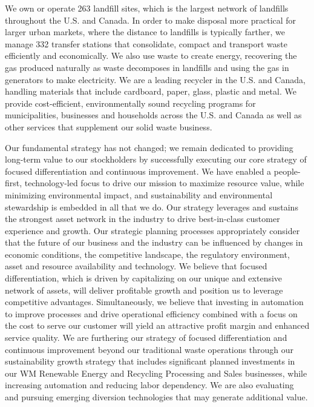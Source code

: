 \documentclass{article}
\begin{document}
We own or operate 263 landfill sites, which is the largest network of landfills throughout the U.S. and Canada. In order to make disposal more practical for larger urban markets, where the distance to landfills is typically farther, we manage 332 transfer stations that consolidate, compact and transport waste efficiently and economically. We also use waste to create energy, recovering the gas produced naturally as waste decomposes in landfills and using the gas in generators to make electricity. We are a leading recycler in the U.S. and Canada, handling materials that include cardboard, paper, glass, plastic and metal. We provide cost-efficient, environmentally sound recycling programs for municipalities, businesses and households across the U.S. and Canada as well as other services that supplement our solid waste business.

Our fundamental strategy has not changed; we remain dedicated to providing long-term value to our stockholders by successfully executing our core strategy of focused differentiation and continuous improvement. We have enabled a people-first, technology-led focus to drive our mission to maximize resource value, while minimizing environmental impact, and sustainability and environmental stewardship is embedded in all that we do. Our strategy leverages and sustains the strongest asset network in the industry to drive best-in-class customer experience and growth. Our strategic planning processes appropriately consider that the future of our business and the industry can be influenced by changes in economic conditions, the competitive landscape, the regulatory environment, asset and resource availability and technology. We believe that focused differentiation, which is driven by capitalizing on our unique and extensive network of assets, will deliver profitable growth and position us to leverage competitive advantages. Simultaneously, we believe that investing in automation to improve processes and drive operational efficiency combined with a focus on the cost to serve our customer will yield an attractive profit margin and enhanced service quality. We are furthering our strategy of focused differentiation and continuous improvement beyond our traditional waste operations through our sustainability growth strategy that includes significant planned investments in our WM Renewable Energy and Recycling Processing and Sales businesses, while increasing automation and reducing labor dependency. We are also evaluating and pursuing emerging diversion technologies that may generate additional value.
\end{document}

